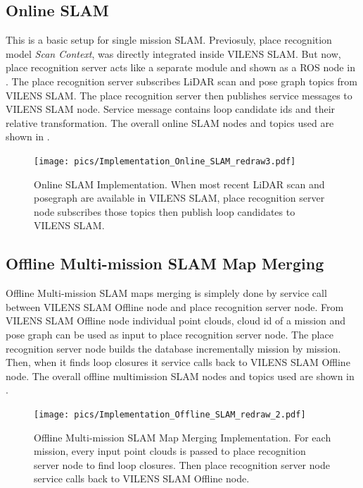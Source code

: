 \subsection{Online SLAM}
This is a basic setup for single mission SLAM. Previosuly, place recognition model \emph{Scan Context}, was directly integrated inside VILENS SLAM. But now, place recognition server acts like a separate module and shown as a ROS node in  . The place recognition server subscribes LiDAR scan and pose graph topics from VILENS SLAM. The place recognition server then publishes service messages to VILENS SLAM node. Service message contains loop candidate ids and their relative transformation. The overall online SLAM nodes and topics used are shown in . 

\begin{figure}[htbp]
  \centering
  \texttt{[image: pics/Implementation\_Online\_SLAM\_redraw3.pdf]}
  \caption{Online SLAM Implementation. When most recent LiDAR scan and posegraph are available in VILENS SLAM, place recognition server node subscribes those topics then publish loop candidates to VILENS SLAM.  }
  \label{fig:implementation_online_slam}
\end{figure}


\subsection{Offline Multi-mission SLAM Map Merging}
Offline Multi-mission SLAM maps merging is simplely done by service call between VILENS SLAM Offline node and place recognition server node. From VILENS SLAM Offline node individual point clouds, cloud id of a mission and pose graph can be used as input to place recognition server node. The place recognition server node builds the database incrementally mission by mission. Then, when it finds loop closures it service calls back to VILENS SLAM Offline node. The overall offline multimission SLAM nodes and topics used are shown in .  

\begin{figure}[htbp]
  \centering
  \texttt{[image: pics/Implementation\_Offline\_SLAM\_redraw\_2.pdf]}
  \caption{Offline Multi-mission SLAM Map Merging Implementation. For each mission, every input point clouds is passed to place recognition server node to find loop closures. Then place recognition server node service calls back to VILENS SLAM Offline node.}
  \label{fig:implementation_offline_slam}
\end{figure}



